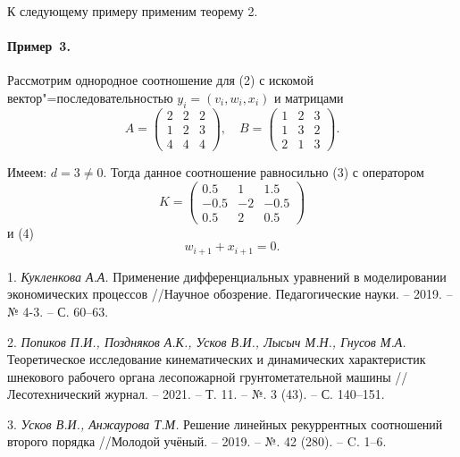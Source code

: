 К следующему примеру применим теорему 2.

\paragraph{Пример~3.}
Рассмотрим однородное соотношение для (2) с искомой вектор"=последовательностью $y_i=(v_i, w_i, x_i)$ и матрицами
\[A=\begin{pmatrix}
2&2&2\\
1&2&3\\
4&4&4
\end{pmatrix}, \quad B= \begin{pmatrix}
1&2&3\\
1&3&2\\
2&1&3
\end{pmatrix}.\]

Имеем: $d=3\ne0$. Тогда данное соотношение равносильно (3) с оператором
\[K=\begin{pmatrix}
 0.5 &  1 &  1.5\\
-0.5 & -2 & -0.5\\
 0.5 &  2 &  0.5
\end{pmatrix}\]
и (4)
\[w_{i+1}+x_{i+1}=0.\]

\litlist

1. {\it Кукленкова А.А.} Применение дифференциальных уравнений в моделировании экономических процессов //Научное обозрение. Педагогические науки. – 2019. – № 4-3. – С. 60–63.

2. {\it Попиков П.И., Поздняков А.К., Усков В.И., Лысыч М.Н., Гнусов М.А.} Теоретическое исследование кинематических и динамических характеристик шнекового рабочего органа лесопожарной грунтометательной машины //Лесотехнический журнал. – 2021. – Т. 11. – №. 3 (43). – С. 140–151.

3. {\it Усков В.И., Анжаурова Т.М.} Решение линейных рекуррентных соотношений второго порядка //Молодой учёный. – 2019. – №. 42 (280). – C. 1–6.

